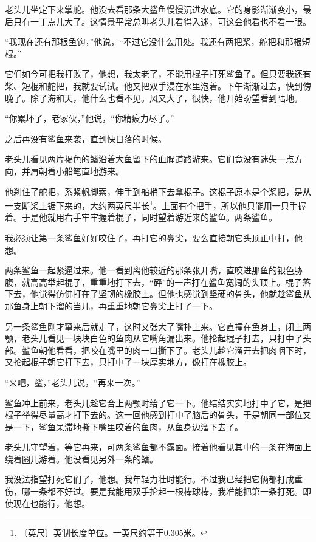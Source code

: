 \documentclass[12pt,UTF-8,openany]{ctexbook}
\begin{document}
\begin{normalsize}
    老头儿坐定下来掌舵。他没去看那条大鲨鱼慢慢沉进水底。它的身影渐渐变小，最后只有一丁点儿大了。这情景平常总叫老头儿看得入迷，可这会他看也不看一眼。
    
    “我现在还有那根鱼钩，”他说，“不过它没什么用处。我还有两把桨，舵把和那根短棍。”
    
    它们如今可把我打败了，他想，我太老了，不能用棍子打死鲨鱼了。但只要我还有桨、短棍和舵把，我就要试试。他又把双手浸在水里泡着。下午渐渐过去，快到傍晚了。除了海和天，他什么也看不见。风又大了，很快，他开始盼望看到陆地。
    
    “你累坏了，老家伙，”他说，“你精疲力尽了。”
    
    之后再没有鲨鱼来袭，直到快日落的时候。
    
    老头儿看见两片褐色的鳍沿着大鱼留下的血腥道路游来。它们竟没有迷失一点方向，并肩朝着小船笔直地游来。
    
    他刹住了舵把，系紧帆脚索，伸手到船梢下去拿棍子。这棍子原本是个桨把，是从一支断桨上锯下来的，大约两英尺半长\footnote{〔英尺〕英制长度单位。一英尺约等于0.305米。}。上面有个把手，所以他只能用一只手握着。于是他就用右手牢牢握着棍子，同时望着游近来的鲨鱼。两条鲨鱼。
    
    我必须让第一条鲨鱼好好咬住了，再打它的鼻尖，要么直接朝它头顶正中打，他想。
    
    两条鲨鱼一起紧逼过来。他一看到离他较近的那条张开嘴，直咬进那鱼的银色胁腹，就高高举起棍子，重重地打下去，“砰”的一声打在鲨鱼宽阔的头顶上。棍子落下去，他觉得仿佛打在了坚韧的橡胶上。但他也感觉到坚硬的骨头，他就趁鲨鱼从那鱼身上朝下溜的当儿，再重重地朝它鼻尖上打了一下。
    
    另一条鲨鱼刚才窜来后就走了，这时又张大了嘴扑上来。它直撞在鱼身上，闭上两颚，老头儿看见一块块白色的鱼肉从它嘴角漏出来。他抡起棍子打去，只打中了头部。鲨鱼朝他看看，把咬在嘴里的肉一口撕下了。老头儿趁它溜开去把肉咽下时，又抡起棍子朝它打下去，只打中了一块厚实地方，像打在橡胶上。
    
    “来吧，鲨，”老头儿说，“再来一次。”
    
    鲨鱼冲上前来，老头儿趁它合上两颚时给了它一下。他结结实实地打中了它，是把棍子举得尽量高才打下去的。这一回他感到打中了脑后的骨头，于是朝同一部位又是一下，鲨鱼呆滞地撕下嘴里咬着的鱼肉，从鱼身边溜下去了。
    
    老头儿守望着，等它再来，可两条鲨鱼都不露面。接着他看见其中的一条在海面上绕着圈儿游着。他没看见另外一条的鳍。
    
    我没法指望打死它们了，他想。我年轻力壮时能行。不过我已经把它俩都打成重伤，哪一条都不好过。要是我能用双手抡起一根棒球棒，我准能把第一条打死。即使现在也能行，他想。
    

\end{normalsize}
\end{document}
